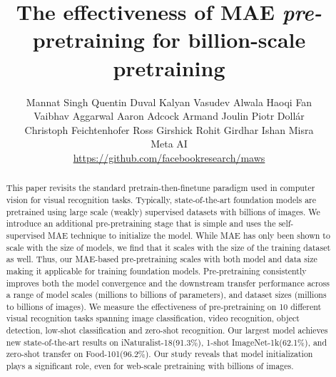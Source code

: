 \documentclass[10pt,twocolumn,letterpaper]{article}
\newcommand{\preptemph}{\emph{pre-}pretraining\xspace}
\newcommand{\mae}{MAE\xspace}
\newcommand{\inetOneK}{ImageNet-1k\xspace}
\newcommand{\inat}{iNaturalist-18\xspace}
\newcommand{\food}{Food-101\xspace}
\begin{document}
\title{The effectiveness of MAE \preptemph for billion-scale pretraining}

\author{
  {\normalsize Mannat Singh \quad Quentin Duval \quad Kalyan Vasudev Alwala \quad Haoqi Fan} \\
  {\normalsize Vaibhav Aggarwal \quad Aaron Adcock \quad Armand Joulin \quad Piotr Doll\'ar }\\
  {\normalsize Christoph Feichtenhofer \quad Ross Girshick \quad Rohit Girdhar \quad Ishan Misra} \\
  {\normalsize Meta AI} \\
  {\normalsize \url{https://github.com/facebookresearch/maws}}
}

\maketitle


\ificcvfinal\thispagestyle{empty}\fi


\begin{abstract}

This paper revisits the standard pretrain-then-finetune paradigm used in computer vision for visual recognition tasks.
Typically, state-of-the-art foundation models are pretrained using large scale (weakly) supervised datasets with billions of images.
We introduce an additional pre-pretraining stage that is simple and uses the self-supervised \mae technique to initialize the model.
While \mae has only been shown to scale with the size of models, we find that it scales with the size of the training dataset as well.
Thus, our \mae-based pre-pretraining scales with both model and data size making it applicable for training foundation models.
Pre-pretraining consistently improves both the model convergence and the downstream transfer performance across a range of model scales (millions to billions of parameters), and dataset sizes (millions to billions of images).
We measure the effectiveness of pre-pretraining on 10 different visual recognition tasks spanning image classification, video recognition, object detection, low-shot classification and zero-shot recognition.
Our largest model achieves new state-of-the-art results on \inat (91.3\%), 1-shot \inetOneK (62.1\%), and zero-shot transfer on 
\food (96.2\%).
Our study reveals that model initialization plays a significant role, even for web-scale pretraining with billions of images.
\end{abstract}
\end{document}
